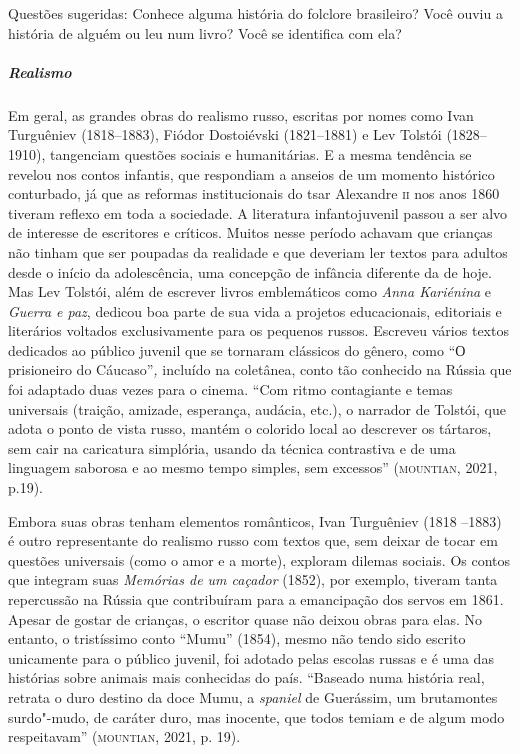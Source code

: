 \documentclass[11pt]{extarticle}
\begin{document}
Questões sugeridas:
Conhece alguma história do folclore brasileiro? Você ouviu a história de
alguém ou leu num livro? Você se identifica com ela?




\subparagraph{Realismo}
Em geral, as grandes obras
do realismo russo, escritas por nomes como Ivan Turguêniev (1818--1883),
Fiódor Dostoiévski (1821--1881) e Lev Tolstói (1828--1910), tangenciam
questões sociais e humanitárias. E a mesma tendência se revelou nos
contos infantis, que respondiam a anseios de um momento histórico
conturbado, já que as reformas institucionais do tsar Alexandre \textsc{ii} nos
anos 1860 tiveram reflexo em toda a sociedade. A literatura
infantojuvenil passou a ser alvo de interesse de escritores e críticos.
Muitos nesse período achavam que crianças não tinham que ser poupadas da
realidade e que deveriam ler textos para adultos desde o início da
adolescência, uma concepção de infância diferente da de hoje. Mas Lev
Tolstói, além de escrever livros emblemáticos como \emph{Anna Kariénina}
e \emph{Guerra e paz}, dedicou boa parte de sua vida a projetos
educacionais, editoriais e literários voltados exclusivamente para os
pequenos russos. Escreveu vários textos dedicados ao público juvenil que
se tornaram clássicos do gênero, como ``О prisioneiro do
Cáucaso''\emph{,} incluído na coletânea, conto tão conhecido na Rússia
que foi adaptado duas vezes para o cinema. ``Com ritmo contagiante e
temas universais (traição, amizade, esperança, audácia, etc.), o
narrador de Tolstói, que adota o ponto de vista russo, mantém o colorido
local ao descrever os tártaros, sem cair na caricatura simplória, usando
da técnica contrastiva e de uma linguagem saborosa e ao mesmo tempo
simples, sem excessos'' (\textsc{mountian}, 2021, p.19).


Embora suas obras tenham elementos românticos, Ivan Turguêniev (1818
--1883) é outro representante do realismo russo com textos que, sem
deixar de tocar em questões universais (como o amor e a morte), exploram
dilemas sociais. Os contos que integram suas \emph{Memórias de um
caçador} (1852), por exemplo, tiveram tanta repercussão na Rússia que
contribuíram para a emancipação dos servos em 1861. Apesar de gostar de
crianças, o escritor quase não deixou obras para elas. No entanto, o
tristíssimo conto ``Mumu'' (1854), mesmo não tendo sido escrito
unicamente para o público juvenil, foi adotado pelas escolas russas e é
uma das histórias sobre animais mais conhecidas do país. ``Baseado numa
história real, retrata o duro destino da doce Mumu, a \emph{spaniel} de
Guerássim, um brutamontes surdo"-mudo, de caráter duro, mas inocente, que
todos temiam e de algum modo respeitavam'' (\textsc{mountian}, 2021, p. 19).
\end{document}
